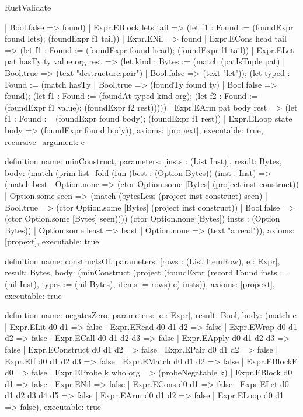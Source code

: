 \begin{lexlean}{RustValidate}
\begin{semanticmodule}
{      | Bool.false => found)
    | Expr.EBlock lets tail => (let f1 : Found := (foundExpr found lets); (foundExpr f1 tail))
    | Expr.ENil => found
    | Expr.ECons head tail => (let f1 : Found := (foundExpr found head); (foundExpr f1 tail))
    | Expr.ELet pat hasTy ty value org rest => (let kind : Bytes := (match (patIsTuple pat)
      | Bool.true => (text "destructure:pair")
      | Bool.false => (text "let")); (let typed : Found := (match hasTy
      | Bool.true => (foundTy found ty)
      | Bool.false => found); (let f1 : Found := (foundAt typed kind org); (let f2 : Found := (foundExpr f1 value); (foundExpr f2 rest)))))
    | Expr.EArm pat body rest => (let f1 : Found := (foundExpr found body); (foundExpr f1 rest))
    | Expr.ELoop state body => (foundExpr found body)),
  axioms: [propext],
  executable: true,
  recursive_argument: e
}

definition{
  name: minConstruct,
  parameters: [insts : (List Inst)],
  result: Bytes,
  body: (match (prim list_fold (fun (best : (Option Bytes)) (inst : Inst) => (match best
      | Option.none => (ctor Option.some [Bytes] (project inst construct))
      | Option.some seen => (match (bytesLess (project inst construct) seen)
        | Bool.true => (ctor Option.some [Bytes] (project inst construct))
        | Bool.false => (ctor Option.some [Bytes] seen)))) (ctor Option.none [Bytes]) insts : (Option Bytes))
    | Option.some least => least
    | Option.none => (text "a read")),
  axioms: [propext],
  executable: true
}

definition{
  name: constructsOf,
  parameters: [rows : (List ItemRow), e : Expr],
  result: Bytes,
  body: (minConstruct (project (foundExpr (record Found {insts := (nil Inst), types := (nil Bytes), items := rows}) e) insts)),
  axioms: [propext],
  executable: true
}

definition{
  name: negatesZero,
  parameters: [e : Expr],
  result: Bool,
  body: (match e
    | Expr.ELit d0 d1 => false
    | Expr.ERead d0 d1 d2 => false
    | Expr.EWrap d0 d1 d2 => false
    | Expr.ECall d0 d1 d2 d3 => false
    | Expr.EApply d0 d1 d2 d3 => false
    | Expr.EConstruct d0 d1 d2 => false
    | Expr.EPair d0 d1 d2 => false
    | Expr.EIf d0 d1 d2 d3 => false
    | Expr.EMatch d0 d1 d2 => false
    | Expr.EBlockE d0 => false
    | Expr.EProbe k who org => (probeNegatable k)
    | Expr.EBlock d0 d1 => false
    | Expr.ENil => false
    | Expr.ECons d0 d1 => false
    | Expr.ELet d0 d1 d2 d3 d4 d5 => false
    | Expr.EArm d0 d1 d2 => false
    | Expr.ELoop d0 d1 => false),
  executable: true
}


\end{semanticmodule}
\end{lexlean}
